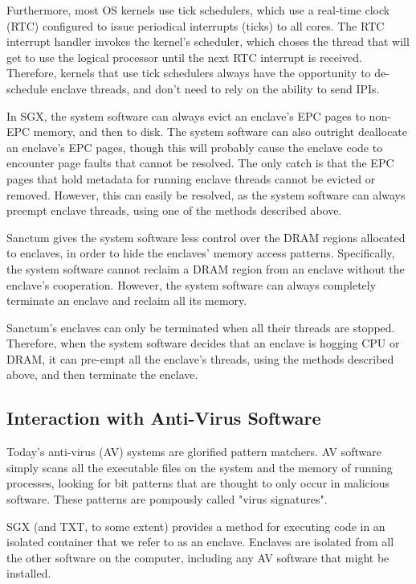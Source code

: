 Furthermore, most OS kernels use tick schedulers, which use a real-time clock
(RTC) configured to issue periodical interrupts (ticks) to all cores. The RTC
interrupt handler invokes the kernel's scheduler, which choses the thread that
will get to use the logical processor until the next RTC interrupt is received.
Therefore, kernels that use tick schedulers always have the opportunity to
de-schedule enclave threads, and don't need to rely on the ability to send
IPIs.

In SGX, the system software can always evict an enclave's EPC pages to non-EPC
memory, and then to disk. The system software can also outright deallocate an
enclave's EPC pages, though this will probably cause the enclave code to
encounter page faults that cannot be resolved. The only catch is that the EPC
pages that hold metadata for running enclave threads cannot be evicted or
removed. However, this can easily be resolved, as the system software can
always preempt enclave threads, using one of the methods described above.


Sanctum gives the system software less control over the DRAM regions allocated
to enclaves, in order to hide the enclaves' memory access patterns.
Specifically, the system software cannot reclaim a DRAM region from an enclave
without the enclave's cooperation. However, the system software can always
completely terminate an enclave and reclaim all its memory.

Sanctum's enclaves can only be terminated when all their threads are stopped.
Therefore, when the system software decides that an enclave is hogging CPU or
DRAM, it can pre-empt all the enclave's threads, using the methods described
above, and then terminate the enclave.


\subsection{Interaction with Anti-Virus Software}

Today's anti-virus (AV) systems are glorified pattern matchers. AV software
simply scans all the executable files on the system and the memory of running
processes, looking for bit patterns that are thought to only occur in malicious
software. These patterns are pompously called "virus signatures".

SGX (and TXT, to some extent) provides a method for executing code in an
isolated container that we refer to as an enclave. Enclaves are isolated from
all the other software on the computer, including any AV software that might be
installed.

